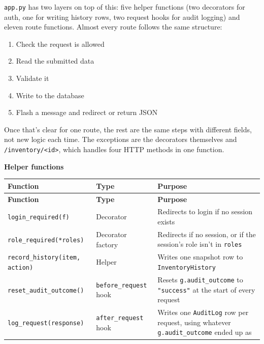 \documentclass[12pt,a4paper]{article}
\begin{document}
\lstinline|app.py| has two layers on top of this: five helper functions (two decorators for auth, one for writing history rows, two request hooks for audit logging) and eleven route functions. Almost every route follows the same structure:

\begin{enumerate}
    \item Check the request is allowed
    \item Read the submitted data
    \item Validate it
    \item Write to the database
    \item Flash a message and redirect or return JSON
\end{enumerate}

Once that's clear for one route, the rest are the same steps with different fields, not new logic each time. The exceptions are the decorators themselves and \lstinline|/inventory/<id>|, which handles four HTTP methods in one function.

\vspace{0.5em}
\noindent\textbf{Helper functions}

\footnotesize
\renewcommand{\arraystretch}{1.3}
\begin{longtable}{@{} >{\raggedright\arraybackslash}p{4.2cm} >{\raggedright\arraybackslash}p{2.8cm} >{\raggedright\arraybackslash}p{8cm} @{}}
\toprule
\textbf{Function} & \textbf{Type} & \textbf{Purpose} \\
\midrule
\endfirsthead

\toprule
\textbf{Function} & \textbf{Type} & \textbf{Purpose} \\
\midrule
\endhead

\bottomrule
\endfoot

\lstinline|login_required(f)| & Decorator & Redirects to login if no session exists \\[0.4em]
\lstinline|role_required(*roles)| & Decorator factory & Redirects if no session, or if the session's role isn't in \lstinline|roles| \\[0.4em]
\lstinline|record_history(item, action)| & Helper & Writes one snapshot row to \lstinline|InventoryHistory| \\[0.4em]
\lstinline|reset_audit_outcome()| & \lstinline|before_request| hook & Resets \lstinline|g.audit_outcome| to \lstinline|"success"| at the start of every request \\[0.4em]
\lstinline|log_request(response)| & \lstinline|after_request| hook & Writes one \lstinline|AuditLog| row per request, using whatever \lstinline|g.audit_outcome| ended up as \\

\end{longtable}
\renewcommand{\arraystretch}{1.0}
\normalsize
\end{document}
